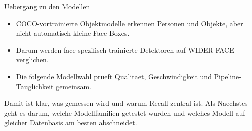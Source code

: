 \begin{frame}{Uebergang zu den Modellen}
\begin{itemize}
    \item COCO-vortrainierte Objektmodelle erkennen Personen und Objekte, aber nicht automatisch kleine Face-Boxes.
    \item Darum werden face-spezifisch trainierte Detektoren auf WIDER FACE verglichen.
    \item Die folgende Modellwahl prueft Qualitaet, Geschwindigkeit und Pipeline-Tauglichkeit gemeinsam.
\end{itemize}
\vspace{0.8em}
\begin{mynote}[Uebergabe]
Damit ist klar, was gemessen wird und warum Recall zentral ist. Als Naechstes geht es darum, welche Modellfamilien getestet wurden und welches Modell auf gleicher Datenbasis am besten abschneidet.
\end{mynote}
\end{frame}
